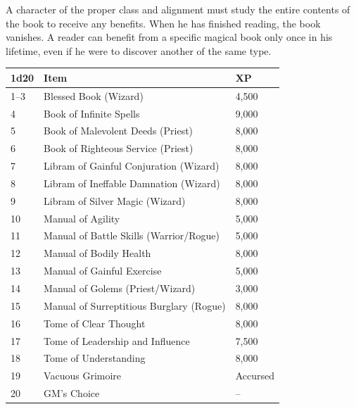 \begin{multicols}{2}
A character of the proper class and alignment must study the entire contents of the book to receive any benefits.  When he has finished reading, the book vanishes.  A reader can benefit from a specific magical book only once in his lifetime, even if he were to discover another of the same type.

\noindent
\begin{minipage}{\columnwidth}

\label{bookstomes}
\noindent
\begin{tabular}{|p{}|p{}|p{}|}
\hline
1d20	& Item	& XP \\
\hline\hline
\rowcolor[gray]{.9}1--3	& Blessed Book (Wizard)	& 4,500 \\
4	& Book of Infinite Spells	& 9,000 \\
\rowcolor[gray]{.9}5	& Book of Malevolent Deeds (Priest)	& 8,000 \\
6	& Book of Righteous Service (Priest)	& 8,000 \\
\rowcolor[gray]{.9}7	& Libram of Gainful Conjuration (Wizard)	& 8,000 \\
8	& Libram of Ineffable Damnation (Wizard)	& 8,000 \\
\rowcolor[gray]{.9}9	& Libram of Silver Magic (Wizard)	& 8,000 \\
10	& Manual of Agility	& 5,000 \\
\rowcolor[gray]{.9}11	& Manual of Battle Skills (Warrior/Rogue)	& 5,000 \\
12	& Manual of Bodily Health	& 8,000 \\
\rowcolor[gray]{.9}13	& Manual of Gainful Exercise	& 5,000 \\
14	& Manual of Golems (Priest/Wizard)	& 3,000 \\
\rowcolor[gray]{.9}15	& Manual of Surreptitious Burglary (Rogue)	& 8,000 \\
16	& Tome of Clear Thought	& 8,000 \\
\rowcolor[gray]{.9}17	& Tome of Leadership and Influence	& 7,500 \\
18	& Tome of Understanding	& 8,000 \\
\rowcolor[gray]{.9}19	& Vacuous Grimoire	& Accursed \\
20	& GM's Choice	& -- \\
\hline
\end{tabular}

\end{minipage}


\end{multicols}

